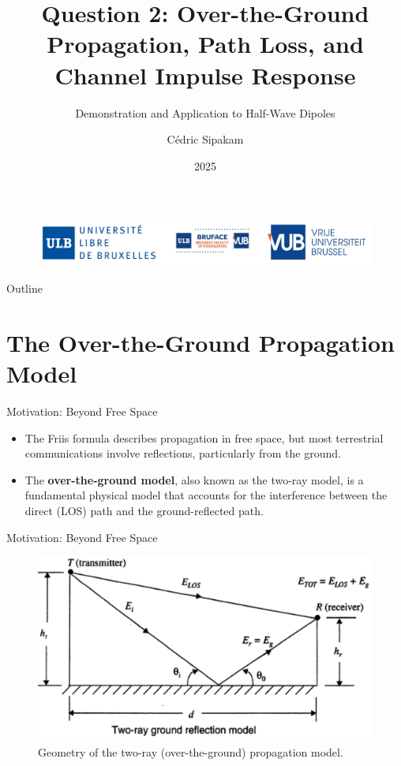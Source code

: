 \documentclass{beamer}
\title[Over-the-Ground Model \& Impulse Response]{Question 2: Over-the-Ground Propagation, Path Loss, and Channel Impulse Response}
\subtitle{Demonstration and Application to Half-Wave Dipoles}
\author{Cédric Sipakam}
\institute{ULB | VUB \\
	\vspace{1.5em}
	ELEC-H415: Communication Channels}
\date{2025}
\begin{document}
	\begin{frame}
		\begin{figure}
			\centering
			\includegraphics[width=0.7\linewidth]{pictures/logos}
		\end{figure}
		\titlepage
	\end{frame}
	
	\begin{frame}{Outline}
		\tableofcontents
	\end{frame}
	
	\section{The Over-the-Ground Propagation Model}
	
	\begin{frame}{Motivation: Beyond Free Space}
		\begin{itemize}
			\item The Friis formula describes propagation in free space, but most terrestrial communications involve reflections, particularly from the ground.
			\item The \textbf{over-the-ground model}, also known as the two-ray model, is a fundamental physical model that accounts for the interference between the direct (LOS) path and the ground-reflected path.
		\end{itemize}
	\end{frame}
	
	\begin{frame}{Motivation: Beyond Free Space}
		\begin{figure}
			\centering
			\includegraphics[width=0.7\linewidth]{"pictures/two-ray-geometry.png"}
			\caption{Geometry of the two-ray (over-the-ground) propagation model.}
		\end{figure}
	\end{frame}
	
\end{document}
